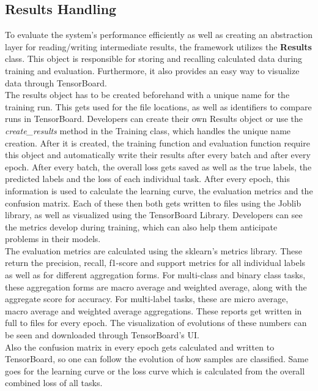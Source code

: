 \subsection{Results Handling} \label{Impl:Training:Results}

To evaluate the system's performance efficiently as well as creating an abstraction layer for reading/writing intermediate results, the framework utilizes the \textbf{Results} class. This object is responsible for storing and recalling calculated data during training and evaluation. Furthermore, it also provides an easy way to visualize data through TensorBoard. \\

The results object has to be created beforehand with a unique name for the training run. This gets used for the file locations, as well as identifiers to compare runs in TensorBoard. Developers can create their own Results object or use the \textit{create\_results} method in the Training class, which handles the unique name creation. After it is created, the training function and evaluation function require this object and automatically write their results after every batch and after every epoch. After every batch, the overall loss gets saved as well as the true labels, the predicted labels and the loss of each individual task. After every epoch, this information is used to calculate the learning curve, the evaluation metrics and the confusion matrix. Each of these then both gets written to files using the Joblib library, as well as visualized using the TensorBoard Library. Developers can see the metrics develop during training, which can also help them anticipate problems in their models. \\

The evaluation metrics are calculated using the sklearn's metrics library. These return the precision, recall, f1-score and support metrics for all individual labels as well as for different aggregation forms. For multi-class and binary class tasks, these aggregation forms are macro average and weighted average, along with the aggregate score for accuracy. For multi-label tasks, these are micro average, macro average and weighted average aggregations. These reports get written in full to files for every epoch. The visualization of evolutions of these numbers can be seen and downloaded through TensorBoard's UI. \\

Also the confusion matrix in every epoch gets calculated and written to TensorBoard, so one can follow the evolution of how samples are classified. Same goes for the learning curve or the loss curve which is calculated from the overall combined loss of all tasks. \\

